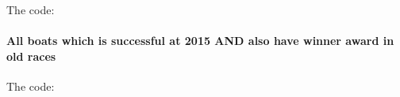 \documentclass[a4paper,10pt,english]{sphinxmanual}
\begin{document}
The code:
\begin{quote}

\end{quote}


\paragraph{All boats which is successful at 2015 AND also have winner award in old races}
\label{developer/member2:all-boats-which-is-successful-at-2015-and-also-have-winner-award-in-old-races}\begin{quote}

\end{quote}

The code:
\begin{quote}

\end{quote}
\end{document}
